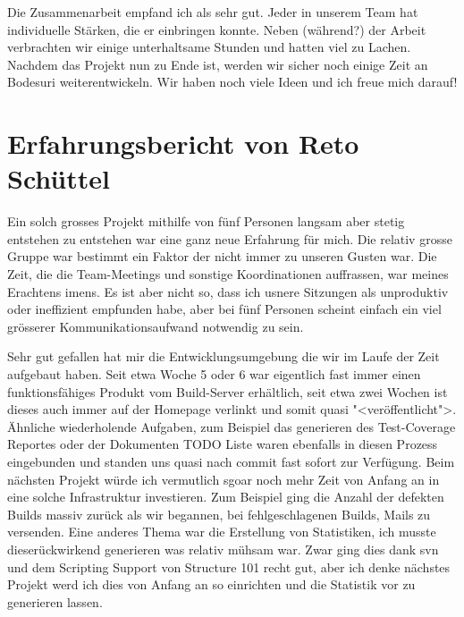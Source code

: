 \documentclass[12pt,halfparskip]{scrartcl}
\begin{document}
Die Zusammenarbeit empfand ich als sehr gut. Jeder in unserem Team hat individuelle Stärken, die er einbringen konnte. Neben (während?) der Arbeit verbrachten wir einige unterhaltsame Stunden und hatten viel zu Lachen. Nachdem das Projekt nun zu Ende ist, werden wir sicher noch einige Zeit an Bodesuri weiterentwickeln. Wir haben noch viele Ideen und ich freue mich darauf!

\section{Erfahrungsbericht von Reto Schüttel}

Ein solch grosses Projekt mithilfe von fünf Personen langsam aber stetig entstehen zu entstehen war eine ganz neue Erfahrung für mich. Die relativ grosse Gruppe war bestimmt ein Faktor der nicht immer zu unseren Gusten war. Die Zeit, die die Team-Meetings und sonstige Koordinationen auffrassen, war meines Erachtens imens. Es ist aber nicht so, dass ich usnere Sitzungen als unproduktiv oder ineffizient empfunden habe, aber bei fünf Personen scheint einfach ein viel grösserer Kommunikationsaufwand notwendig zu sein.

Sehr gut gefallen hat mir die Entwicklungsumgebung die wir im Laufe der Zeit aufgebaut haben. Seit etwa Woche 5 oder 6 war eigentlich fast immer einen funktionsfähiges Produkt vom Build-Server erhältlich, seit etwa zwei Wochen ist dieses auch immer auf der Homepage verlinkt und somit quasi "<veröffentlicht">.  Ähnliche wiederholende Aufgaben, zum Beispiel das generieren des Test-Coverage Reportes oder der Dokumenten TODO Liste waren ebenfalls in diesen Prozess eingebunden und standen uns quasi nach commit fast sofort zur Verfügung. Beim nächsten Projekt würde ich vermutlich sgoar noch mehr Zeit von Anfang an in eine solche Infrastruktur investieren. Zum Beispiel ging die Anzahl der defekten Builds massiv zurück als wir begannen, bei fehlgeschlagenen Builds, Mails zu versenden. Eine anderes Thema war die Erstellung von Statistiken, ich musste dieserückwirkend generieren was relativ mühsam war. Zwar ging dies dank svn und dem Scripting Support von Structure 101 recht gut, aber ich denke nächstes Projekt werd ich dies von Anfang an so einrichten und die Statistik vor zu generieren lassen.
\end{document}
